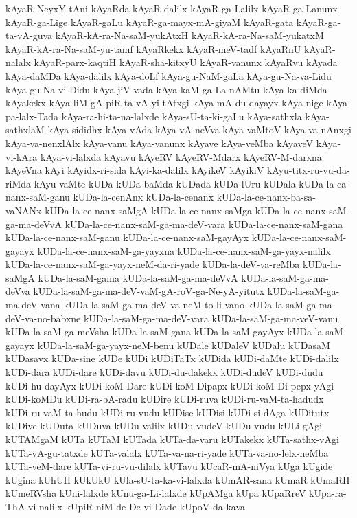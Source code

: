 {kAyaR-NeyxY-tAni
kAyaRda
kAyaR-dalilx
kAyaR-ga-Lalilx
kAyaR-ga-Lanunx
kAyaR-ga-Lige
kAyaR-gaLu
kAyaR-ga-mayx-mA-giyaM
kAyaR-gata
kAyaR-ga-ta-vA-guva
kAyaR-kA-ra-Na-saM-yukAtxH
kAyaR-kA-ra-Na-saM-yukatxM
kAyaR-kA-ra-Na-saM-yu-tamf
kAyaRkekx
kAyaR-meV-tadf
kAyaRnU
kAyaR-nalalx
kAyaR-parx-kaqtiH
kAyaR-sha-kitxyU
kAyaR-vanunx
kAyaRvu
kAyada
kAya-daMDa
kAya-dalilx
kAya-doLf
kAya-gu-NaM-gaLa
kAya-gu-Na-va-Lidu
kAya-gu-Na-vi-Didu
kAya-jiV-vada
kAya-kaM-ga-La-nAMtu
kAya-ka-diMda
kAyakekx
kAya-liM-gA-piR-ta-vA-yi-tAtxgi
kAya-mA-du-dayayx
kAya-nige
kAya-pa-lalx-Tada
kAya-ra-hi-ta-na-lalxde
kAya-sU-ta-ki-gaLu
kAya-sathxla
kAya-sathxlaM
kAya-sididhx
kAya-vAda
kAya-vA-neVva
kAya-vaMtoV
kAya-va-nAnxgi
kAya-va-nenxlAlx
kAya-vanu
kAya-vanunx
kAyave
kAya-veMba
kAyaveV
kAya-vi-kAra
kAya-vi-lalxda
kAyavu
kAyeRV
kAyeRV-Mdarx
kAyeRV-M-darxna
kAyeVna
kAyi
kAyidx-ri-sida
kAyi-ka-dalilx
kAyikeV
kAyikiV
kAyu-titx-ru-vu-da-riMda
kAyu-vaMte
kUDa
kUDa-baMda
kUDada
kUDa-lUru
kUDala
kUDa-la-ca-nanx-saM-ganu
kUDa-la-cenAnx
kUDa-la-cenanx
kUDa-la-ce-nanx-ba-sa-vaNANx
kUDa-la-ce-nanx-saMgA
kUDa-la-ce-nanx-saMga
kUDa-la-ce-nanx-saM-ga-ma-deVvA
kUDa-la-ce-nanx-saM-ga-ma-deV-vara
kUDa-la-ce-nanx-saM-gana
kUDa-la-ce-nanx-saM-ganu
kUDa-la-ce-nanx-saM-gayAyx
kUDa-la-ce-nanx-saM-gayayx
kUDa-la-ce-nanx-saM-ga-yayxna
kUDa-la-ce-nanx-saM-ga-yayx-nalilx
kUDa-la-ce-nanx-saM-ga-yayx-neM-da-ri-yade
kUDa-la-deV-va-reMba
kUDa-la-saMgA
kUDa-la-saM-gama
kUDa-la-saM-ga-ma-deVvA
kUDa-la-saM-ga-ma-deVva
kUDa-la-saM-ga-ma-deV-vaM-gA-roV-ga-Ne-yA-yitutx
kUDa-la-saM-ga-ma-deV-vana
kUDa-la-saM-ga-ma-deV-va-neM-to-li-vano
kUDa-la-saM-ga-ma-deV-va-no-babxne
kUDa-la-saM-ga-ma-deV-vara
kUDa-la-saM-ga-ma-veV-vanu
kUDa-la-saM-ga-meVsha
kUDa-la-saM-gana
kUDa-la-saM-gayAyx
kUDa-la-saM-gayayx
kUDa-la-saM-ga-yayx-neM-benu
kUDale
kUDaleV
kUDalu
kUDasaM
kUDasavx
kUDa-sine
kUDe
kUDi
kUDiTaTx
kUDida
kUDi-daMte
kUDi-dalilx
kUDi-dara
kUDi-dare
kUDi-davu
kUDi-du-dakekx
kUDi-dudeV
kUDi-dudu
kUDi-hu-dayAyx
kUDi-koM-Dare
kUDi-koM-Dipapx
kUDi-koM-Di-pepx-yAgi
kUDi-koMDu
kUDi-ra-bA-radu
kUDire
kUDi-ruva
kUDi-ru-vaM-ta-hadudx
kUDi-ru-vaM-ta-hudu
kUDi-ru-vudu
kUDise
kUDisi
kUDi-si-dAga
kUDitutx
kUDive
kUDuta
kUDuva
kUDu-valilx
kUDu-vudeV
kUDu-vudu
kULi-gAgi
kUTAMgaM
kUTa
kUTaM
kUTada
kUTa-da-varu
kUTakekx
kUTa-sathx-vAgi
kUTa-vA-gu-tatxde
kUTa-valalx
kUTa-va-na-ri-yade
kUTa-va-no-lelx-neMba
kUTa-veM-dare
kUTa-vi-ru-vu-dilalx
kUTavu
kUcaR-mA-niVya
kUga
kUgide
kUgina
kUhUH
kUkUkU
kUla-sU-ta-ka-vi-lalxda
kUmAR-sana
kUmaR
kUmaRH
kUmeRVsha
kUni-lalxde
kUnu-ga-Li-lalxde
kUpAMga
kUpa
kUpaRreV
kUpa-ra-ThA-vi-nalilx
kUpiR-niM-de-De-vi-Dade
kUpoV-da-kava
}
